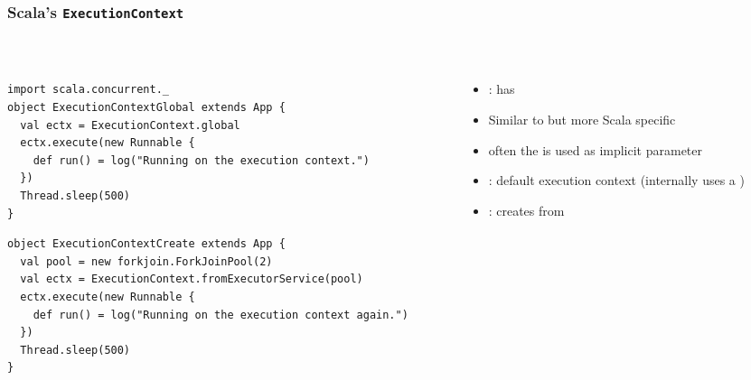 \documentclass[aspectratio=169]{beamer}
\begin{document}
\begin{frame}[fragile]\frametitle{Scala's \texttt{ExecutionContext}}
~\\[-6mm]
\begin{columns}
\begin{column}{0.74\textwidth}
\begin{lstlisting}[emph={execute,sleep,log,global}]
import scala.concurrent._
object ExecutionContextGlobal extends App {
  val ectx = ExecutionContext.global
  ectx.execute(new Runnable {
    def run() = log("Running on the execution context.")
  })
  Thread.sleep(500)
}
\end{lstlisting}
\begin{lstlisting}[emph={execute,sleep,log,global,fromExecutorService}]
object ExecutionContextCreate extends App {
  val pool = new forkjoin.ForkJoinPool(2)
  val ectx = ExecutionContext.fromExecutorService(pool)
  ectx.execute(new Runnable {
    def run() = log("Running on the execution context again.")
  })
  Thread.sleep(500)
}
\end{lstlisting}
\end{column}
\begin{column}{0.36\textwidth}
\begin{itemize}
  \item {}: has 
  \item Similar to  but more Scala specific
  \item often the  is used as implicit parameter
  \item {}: default execution context (internally uses a )
  \item {}: creates  from 
\end{itemize}
\end{column}
\end{columns}
\end{frame}
\end{document}
